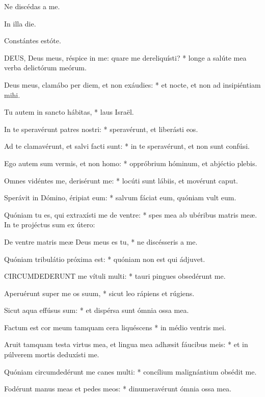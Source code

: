   Ne discédas a me.


  In illa die.

  Constántes estóte.


\lettrine[lines=2]{D}{EUS}, Deus meus, réspice in me: quare me dereliquísti? * longe a salúte mea verba delictórum meórum.

Deus meus, clamábo per diem, et non exáudies: * et nocte, et non ad insipiéntiam mihi.

Tu autem in sancto hábitas, * laus Israël.

In te speravérunt patres nostri: * speravérunt, et liberásti eos.

Ad te clamavérunt, et salvi facti sunt: * in te speravérunt, et non sunt confúsi.

Ego autem sum vermis, et non homo: * oppróbrium hóminum, et abjéctio plebis.

Omnes vidéntes me, derisérunt me: * locúti sunt lábiis, et movérunt caput.

Sperávit in Dómino, éripiat eum: * salvum fáciat eum, quóniam vult eum.

Quóniam tu es, qui extraxísti me de ventre: * spes mea ab ubéribus matris meæ. In te projéctus sum ex útero:

De ventre matris meæ Deus meus es tu, * ne discésseris a me.

Quóniam tribulátio próxima est: * quóniam non est qui ádjuvet.


\lettrine[lines=2]{C}{IRCUMDEDERUNT} me vítuli multi: * tauri pingues obsedérunt me.

Aperuérunt super me os suum, * sicut leo rápiens et rúgiens.

Sicut aqua effúsus sum: * et dispérsa sunt ómnia ossa mea.

Factum est cor meum tamquam cera liquéscens * in médio ventris mei.

Aruit tamquam testa virtus mea, et lingua mea adhæsit fáucibus meis: * et in púlverem mortis deduxísti me.

Quóniam circumdedérunt me canes multi: * concílium malignántium obsédit me.

Fodérunt manus meas et pedes meos: * dinumeravérunt ómnia ossa mea.

